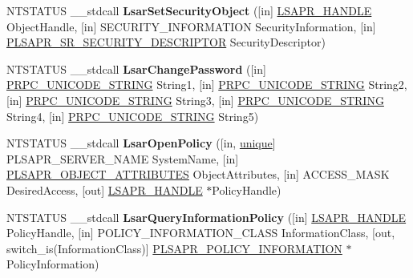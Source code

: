 \begin{DoxyCompactItemize}
\mbox{\label{interfacelsarpc_a0420d0f7019ae7c3a0abe3b282dec5e3}} 
N\+T\+S\+T\+A\+T\+US \+\_\+\+\_\+stdcall {\bfseries Lsar\+Set\+Security\+Object} (\mbox{[}in\mbox{]} \hyperlink{interfacevoid}{L\+S\+A\+P\+R\+\_\+\+H\+A\+N\+D\+LE} Object\+Handle, \mbox{[}in\mbox{]} S\+E\+C\+U\+R\+I\+T\+Y\+\_\+\+I\+N\+F\+O\+R\+M\+A\+T\+I\+ON Security\+Information, \mbox{[}in\mbox{]} \hyperlink{struct___l_s_a_p_r___s_r___s_e_c_u_r_i_t_y___d_e_s_c_r_i_p_t_o_r}{P\+L\+S\+A\+P\+R\+\_\+\+S\+R\+\_\+\+S\+E\+C\+U\+R\+I\+T\+Y\+\_\+\+D\+E\+S\+C\+R\+I\+P\+T\+OR} Security\+Descriptor)
\item 
\mbox{\label{interfacelsarpc_a14e65602dcc54a36d8a88c3eee8dc879}} 
N\+T\+S\+T\+A\+T\+US \+\_\+\+\_\+stdcall {\bfseries Lsar\+Change\+Password} (\mbox{[}in\mbox{]} \hyperlink{struct___r_p_c___u_n_i_c_o_d_e___s_t_r_i_n_g}{P\+R\+P\+C\+\_\+\+U\+N\+I\+C\+O\+D\+E\+\_\+\+S\+T\+R\+I\+NG} String1, \mbox{[}in\mbox{]} \hyperlink{struct___r_p_c___u_n_i_c_o_d_e___s_t_r_i_n_g}{P\+R\+P\+C\+\_\+\+U\+N\+I\+C\+O\+D\+E\+\_\+\+S\+T\+R\+I\+NG} String2, \mbox{[}in\mbox{]} \hyperlink{struct___r_p_c___u_n_i_c_o_d_e___s_t_r_i_n_g}{P\+R\+P\+C\+\_\+\+U\+N\+I\+C\+O\+D\+E\+\_\+\+S\+T\+R\+I\+NG} String3, \mbox{[}in\mbox{]} \hyperlink{struct___r_p_c___u_n_i_c_o_d_e___s_t_r_i_n_g}{P\+R\+P\+C\+\_\+\+U\+N\+I\+C\+O\+D\+E\+\_\+\+S\+T\+R\+I\+NG} String4, \mbox{[}in\mbox{]} \hyperlink{struct___r_p_c___u_n_i_c_o_d_e___s_t_r_i_n_g}{P\+R\+P\+C\+\_\+\+U\+N\+I\+C\+O\+D\+E\+\_\+\+S\+T\+R\+I\+NG} String5)
\item 
\mbox{\label{interfacelsarpc_a8c743f5015774a00fa4bd00d5b1725a4}} 
N\+T\+S\+T\+A\+T\+US \+\_\+\+\_\+stdcall {\bfseries Lsar\+Open\+Policy} (\mbox{[}in, \hyperlink{interfaceunique}{unique}\mbox{]} P\+L\+S\+A\+P\+R\+\_\+\+S\+E\+R\+V\+E\+R\+\_\+\+N\+A\+ME System\+Name, \mbox{[}in\mbox{]} \hyperlink{struct___l_s_a_p_r___o_b_j_e_c_t___a_t_t_r_i_b_u_t_e_s}{P\+L\+S\+A\+P\+R\+\_\+\+O\+B\+J\+E\+C\+T\+\_\+\+A\+T\+T\+R\+I\+B\+U\+T\+ES} Object\+Attributes, \mbox{[}in\mbox{]} A\+C\+C\+E\+S\+S\+\_\+\+M\+A\+SK Desired\+Access, \mbox{[}out\mbox{]} \hyperlink{interfacevoid}{L\+S\+A\+P\+R\+\_\+\+H\+A\+N\+D\+LE} $\ast$Policy\+Handle)
\item 
\mbox{\label{interfacelsarpc_a20c1b741e879a3019303b7fbc36d2272}} 
N\+T\+S\+T\+A\+T\+US \+\_\+\+\_\+stdcall {\bfseries Lsar\+Query\+Information\+Policy} (\mbox{[}in\mbox{]} \hyperlink{interfacevoid}{L\+S\+A\+P\+R\+\_\+\+H\+A\+N\+D\+LE} Policy\+Handle, \mbox{[}in\mbox{]} P\+O\+L\+I\+C\+Y\+\_\+\+I\+N\+F\+O\+R\+M\+A\+T\+I\+O\+N\+\_\+\+C\+L\+A\+SS Information\+Class, \mbox{[}out, switch\+\_\+is(Information\+Class)\mbox{]} \hyperlink{union___l_s_a_p_r___p_o_l_i_c_y___i_n_f_o_r_m_a_t_i_o_n}{P\+L\+S\+A\+P\+R\+\_\+\+P\+O\+L\+I\+C\+Y\+\_\+\+I\+N\+F\+O\+R\+M\+A\+T\+I\+ON} $\ast$Policy\+Information)

\end{DoxyCompactItemize}
